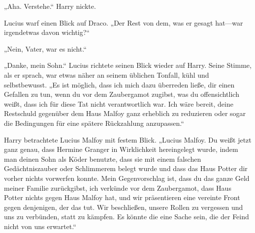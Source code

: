 „Aha. Verstehe.“ Harry nickte.

Lucius warf einen Blick auf Draco. „Der Rest von dem, was er gesagt hat—war irgendetwas davon wichtig?“

„Nein, Vater, war es nicht.“

„Danke, mein Sohn.“ Lucius richtete seinen Blick wieder auf Harry. Seine Stimme, als er sprach, war etwas näher an seinem üblichen Tonfall, kühl und selbstbewusst. „Es ist möglich, dass ich mich dazu überreden ließe, dir einen Gefallen zu tun, wenn du vor dem Zaubergamot zugibst, was du offensichtlich weißt, dass ich für diese Tat nicht verantwortlich war. Ich wäre bereit, deine Restschuld gegenüber dem Haus Malfoy ganz erheblich zu reduzieren oder sogar die Bedingungen für eine spätere Rückzahlung anzupassen.“

Harry betrachtete Lucius Malfoy mit festem Blick.
„Lucius Malfoy. Du weißt jetzt ganz genau, dass Hermine Granger in Wirklichkeit hereingelegt wurde, indem man deinen Sohn als Köder benutzte, dass sie mit einem falschen Gedächtniszauber oder Schlimmerem belegt wurde und dass das Haus Potter dir vorher nichts vorwerfen konnte. Mein Gegenvorschlag ist, dass du das ganze Geld meiner Familie zurückgibst, ich verkünde vor dem Zaubergamot, dass Haus Potter nichts gegen Haus Malfoy hat, und wir präsentieren eine vereinte Front gegen denjenigen, der das tut. Wir beschließen, unsere Rollen zu vergessen und uns zu verbünden, statt zu kämpfen. Es könnte die eine Sache sein, die der Feind nicht von uns erwartet.“

